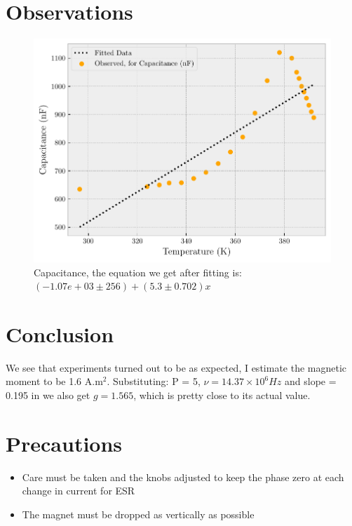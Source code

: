 \documentclass{double}
\begin{document}
\section{Observations}

\begin{figure}[H]
\centering
\includegraphics[width = \columnwidth]{./9Capacitance9.pdf}
\caption{Capacitance, the equation we get after fitting is: $(-1.07e+03 \pm 256) + (5.3 \pm 0.702)x$}
\label{fig:"capacitance"}
\end{figure}
 
\section{Conclusion}

We see that experiments turned out to be as expected, I estimate the magnetic moment to be 1.6 A.m\(^2\). Substituting: P = 5, \(\nu = 14.37 \times 10^6 Hz\) and slope = 0.195 in we also get \(g = 1.565\), which is pretty close to its actual value.

\section{Precautions}

\begin{itemize}
\tightlist
\item
  Care must be taken and the knobs adjusted to keep the phase zero at each change in current for ESR
\item
  The magnet must be dropped as vertically as possible
\end{itemize}
\end{document}
